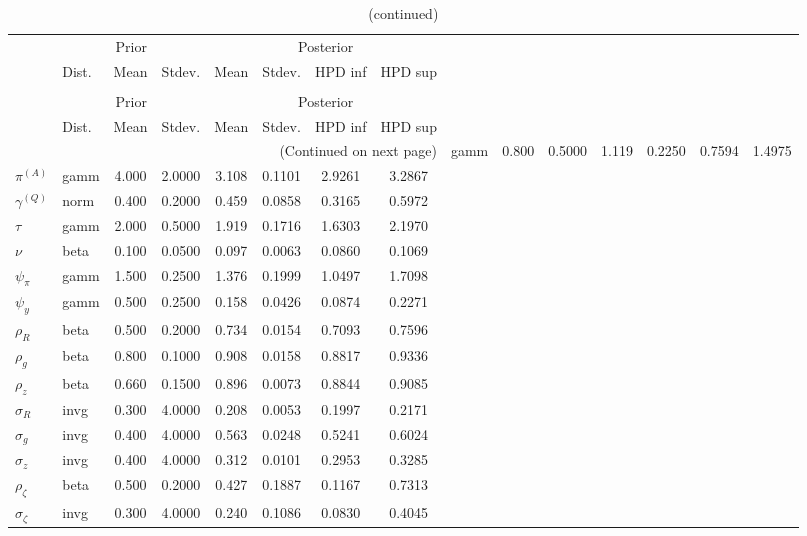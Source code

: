  
\begin{center}
\begin{longtable}{llcccccc} 
\caption{Results from Metropolis-Hastings (parameters)}
 \label{Table:MHPosterior:1}\\
\toprule 
  & \multicolumn{3}{c}{Prior}  &  \multicolumn{4}{c}{Posterior} \\
  \cmidrule(r{.75em}){2-4} \cmidrule(r{.75em}){5-8}
  & Dist. & Mean  & Stdev. & Mean & Stdev. & HPD inf & HPD sup\\
\midrule \endfirsthead 
\caption{(continued)}\\\toprule 
  & \multicolumn{3}{c}{Prior}  &  \multicolumn{4}{c}{Posterior} \\
  \cmidrule(r{.75em}){2-4} \cmidrule(r{.75em}){5-8}
  & Dist. & Mean  & Stdev. & Mean & Stdev. & HPD inf & HPD sup\\
\midrule \endhead 
\bottomrule \multicolumn{8}{r}{(Continued on next page)} \endfoot 
\bottomrule \endlastfoot 
${r_{A}}$ & gamm &   0.800 & 0.5000 &   1.119& 0.2250 &  0.7594 &  1.4975 \\ 
${\pi^{(A)}}$ & gamm &   4.000 & 2.0000 &   3.108& 0.1101 &  2.9261 &  3.2867 \\ 
${\gamma^{(Q)}}$ & norm &   0.400 & 0.2000 &   0.459& 0.0858 &  0.3165 &  0.5972 \\ 
${\tau}$ & gamm &   2.000 & 0.5000 &   1.919& 0.1716 &  1.6303 &  2.1970 \\ 
${\nu}$ & beta &   0.100 & 0.0500 &   0.097& 0.0063 &  0.0860 &  0.1069 \\ 
${\psi_\pi}$ & gamm &   1.500 & 0.2500 &   1.376& 0.1999 &  1.0497 &  1.7098 \\ 
${\psi_y}$ & gamm &   0.500 & 0.2500 &   0.158& 0.0426 &  0.0874 &  0.2271 \\ 
${\rho_R}$ & beta &   0.500 & 0.2000 &   0.734& 0.0154 &  0.7093 &  0.7596 \\ 
${\rho_{g}}$ & beta &   0.800 & 0.1000 &   0.908& 0.0158 &  0.8817 &  0.9336 \\ 
${\rho_z}$ & beta &   0.660 & 0.1500 &   0.896& 0.0073 &  0.8844 &  0.9085 \\ 
${\sigma_R}$ & invg &   0.300 & 4.0000 &   0.208& 0.0053 &  0.1997 &  0.2171 \\ 
${\sigma_{g}}$ & invg &   0.400 & 4.0000 &   0.563& 0.0248 &  0.5241 &  0.6024 \\ 
${\sigma_z}$ & invg &   0.400 & 4.0000 &   0.312& 0.0101 &  0.2953 &  0.3285 \\ 
${\rho_\zeta}$ & beta &   0.500 & 0.2000 &   0.427& 0.1887 &  0.1167 &  0.7313 \\ 
${\sigma_\zeta}$ & invg &   0.300 & 4.0000 &   0.240& 0.1086 &  0.0830 &  0.4045 \\ 
\end{longtable}
 \end{center}

